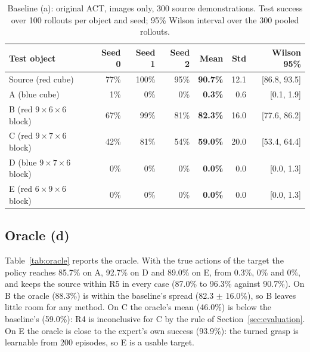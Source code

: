 \documentclass{article}
\begin{document}
\begin{table}[t]
  \caption{Baseline (a): original ACT, images only, 300 source demonstrations. Test
  success over 100 rollouts per object and seed; 95\% Wilson interval over the 300 pooled
  rollouts.}
  \label{tab:baseline}
  \centering
  \small
  \begin{tabular}{@{}lrrrrrr@{}}
    \toprule
    Test object & Seed 0 & Seed 1 & Seed 2 & Mean & Std & Wilson 95\% \\
    \midrule
    Source (red cube) & 77\% & 100\% & 95\% & \textbf{90.7\%} & 12.1 & [86.8, 93.5] \\
    A (blue cube) & 1\% & 0\% & 0\% & \textbf{0.3\%} & 0.6 & [0.1, 1.9] \\
    B (red $9 \times 6 \times 6$ block) & 67\% & 99\% & 81\% & \textbf{82.3\%} & 16.0 & [77.6, 86.2] \\
    C (red $9 \times 7 \times 6$ block) & 42\% & 81\% & 54\% & \textbf{59.0\%} & 20.0 & [53.4, 64.4] \\
    D (blue $9 \times 7 \times 6$ block) & 0\% & 0\% & 0\% & \textbf{0.0\%} & 0.0 & [0.0, 1.3] \\
    E (red $6 \times 9 \times 6$ block) & 0\% & 0\% & 0\% & \textbf{0.0\%} & 0.0 & [0.0, 1.3] \\
    \bottomrule
  \end{tabular}
\end{table}

\subsection{Oracle (d)}
Table~\ref{tab:oracle} reports the oracle. With the true actions of the target the policy
reaches 85.7\% on A, 92.7\% on D and 89.0\% on E, from 0.3\%, 0\% and 0\%, and keeps the source within R5 in
every case (87.0\% to 96.3\% against 90.7\%). On B the oracle (88.3\%) is within the
baseline's spread (82.3 $\pm$ 16.0\%), so B leaves little room for any method. On C the
oracle's mean (46.0\%) is below the baseline's (59.0\%): R4 is inconclusive for C by the
rule of Section~\ref{sec:evaluation}. On E the oracle is close to the expert's own
success (93.9\%): the turned grasp is learnable from 200 episodes, so E is a usable target.
\end{document}
